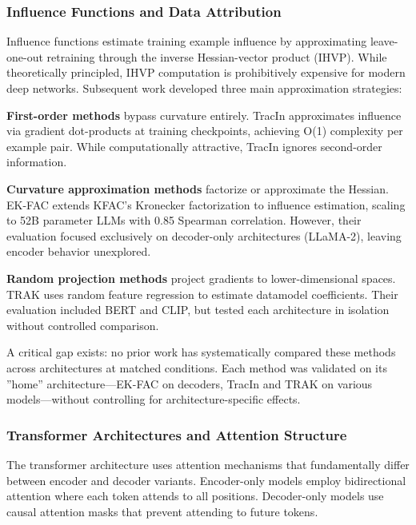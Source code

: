
\subsubsection{Influence Functions and Data Attribution}

Influence functions \citep{koh2017understanding} estimate training example influence by approximating leave-one-out retraining through the inverse Hessian-vector product (IHVP). While theoretically principled, IHVP computation is prohibitively expensive for modern deep networks. Subsequent work developed three main approximation strategies:

\textbf{First-order methods} bypass curvature entirely. TracIn \citep{pruthi2020estimating} approximates influence via gradient dot-products at training checkpoints, achieving O(1) complexity per example pair. While computationally attractive, TracIn ignores second-order information.

\textbf{Curvature approximation methods} factorize or approximate the Hessian. EK-FAC \citep{grosse2023studying} extends KFAC's Kronecker factorization to influence estimation, scaling to 52B parameter LLMs with 0.85 Spearman correlation. However, their evaluation focused exclusively on decoder-only architectures (LLaMA-2), leaving encoder behavior unexplored.

\textbf{Random projection methods} project gradients to lower-dimensional spaces. TRAK \citep{park2023trak} uses random feature regression to estimate datamodel coefficients. Their evaluation included BERT and CLIP, but tested each architecture in isolation without controlled comparison.

A critical gap exists: no prior work has systematically compared these methods across architectures at matched conditions. Each method was validated on its ''home'' architecture---EK-FAC on decoders, TracIn and TRAK on various models---without controlling for architecture-specific effects.

\subsubsection{Transformer Architectures and Attention Structure}

The transformer architecture \citep{vaswani2017attention} uses attention mechanisms that fundamentally differ between encoder and decoder variants. Encoder-only models \citep{devlin2019bert} employ bidirectional attention where each token attends to all positions. Decoder-only models \citep{radford2019language} use causal attention masks that prevent attending to future tokens.

